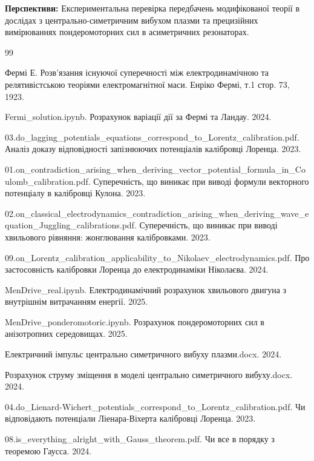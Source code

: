 \documentclass[12pt, a4paper]{article}
\begin{document}
\textbf{Перспективи:} Експериментальна перевірка передбачень модифікованої теорії в дослідах з центрально-симетричним вибухом плазми та прецизійних вимірюваннях пондеромоторних сил в асиметричних резонаторах.

\begin{thebibliography}{99}

Фермі Е. Розв'язання існуючої суперечності між електродинамічною та релятивістською теоріями електромагнітної маси. Енріко Фермі, т.1 стор. 73, 1923.

Fermi\_solution.ipynb. Розрахунок варіації дії за Фермі та Ландау. 2024.

03.do\_lagging\_potentials\_equations\_correspond\_to\_Lorentz\_calibration.pdf. Аналіз доказу відповідності запізнюючих потенціалів калібровці Лоренца. 2023.

01.on\_contradiction\_arising\_when\_deriving\_vector\_potential\_formula\_in\_Coulomb\_calibration.pdf. Суперечність, що виникає при виводі формули векторного потенціалу в калібровці Кулона. 2023.

02.on\_classical\_electrodynamics\_contradiction\_arising\_when\_deriving\_wave\_equation\_Juggling\_calibrations.pdf. Суперечність, що виникає при виводі хвильового рівняння: жонглювання калібровками. 2023.

09.on\_Lorentz\_calibration\_applicability\_to\_Nikolaev\_electrodynamics.pdf. Про застосовність калібровки Лоренца до електродинаміки Ніколаєва. 2024.

MenDrive\_real.ipynb. Електродинамічний розрахунок хвильового двигуна з внутрішнім витрачанням енергії. 2025.

MenDrive\_ponderomotoric.ipynb. Розрахунок пондеромоторних сил в анізотропних середовищах. 2025.

Електричний імпульс центрально симетричного вибуху плазми.docx. 2024.

Розрахунок струму зміщення в моделі центрально симетричного вибуху.docx. 2024.

04.do\_Lienard-Wichert\_potentials\_correspond\_to\_Lorentz\_calibration.pdf. Чи відповідають потенціали Ліенара-Віхерта калібровці Лоренца. 2023.

08.is\_everything\_alright\_with\_Gauss\_theorem.pdf. Чи все в порядку з теоремою Гаусса. 2024.


\end{thebibliography}
\end{document}

